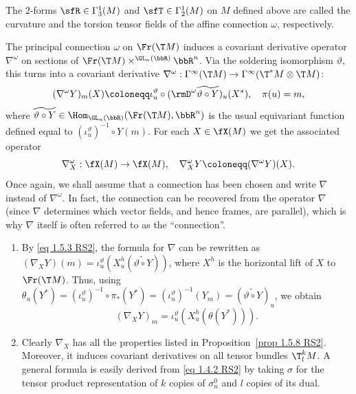 \begin{defn}
    The $2$-forms $\sfR\in \Gamma_3^1(M)$ and $\sfT\in\Gamma_2^1(M)$ on $M$ defined above are called the curvature and the torsion tensor fields of the affine connection $\omega$, respectively.
\end{defn}


The principal connection $\omega$ on $\Fr(\T M)$ induces a covariant derivative operator $\nabla^\omega$ on sections of $\Fr(\T M)\times^{\GL_n(\bbR)}\bbR^n$. Via the soldering isomorphism $\vartheta$, this turns into a covariant derivative $\nabla^\omega:\Gamma^\infty(\T M)\to \Gamma^\infty(\T^\ast M\otimes \T M)$:
\[(\nabla^\omega Y)_m(X)\coloneqq \iota_u^\vartheta\circ (\rmD^\omega \widetilde{\vartheta\circ Y})_u(X^\ast),\quad \pi(u)=m,\]
where $\widetilde{\vartheta\circ Y}\in\Hom_{\GL_n(\bbR)}(\Fr(\T M),\bbR^n)$ is the usual equivariant function defined equal to $(\iota_u^\vartheta)^{-1}\circ Y(m)$. For each $X\in\fX(M)$ we get the associated operator
\[\nabla_X^\omega:\fX(M)\to \fX(M),\quad \nabla_X^\omega Y\coloneqq (\nabla^\omega Y)(X).\]
Once again, we shall assume that a connection has been chosen and write $\nabla$ instead of $\nabla^\omega$. In fact, the connection can be recovered from the operator $\nabla$ (since $\nabla$ determines which vector fields, and hence frames, are parallel), which is why $\nabla$ itself is often referred to as the ``connection''.

\begin{rem}\label{rem 2.1.17 RS2}
    \begin{enumerate}
        \item By \eqref{eq 1.5.3 RS2}, the formula for $\nabla$ can be rewritten as $(\nabla_X Y)(m)=\iota_u^\vartheta(X_u^h(\widetilde{\vartheta\circ Y}))$, where $X^h$ is the horizontal lift of $X$ to $\Fr(\T M)$. Thus, using $\theta_u(Y^\ast)=(\iota_u^\vartheta)^{-1}\circ\pi_\ast(Y^\ast)=(\iota_u^\vartheta)^{-1}(Y_m)=(\widetilde{\vartheta\circ Y})_u$, we obtain 
        \[(\nabla_X Y)_m=\iota_u^\vartheta(X_u^h(\theta(Y^\ast))).\label{eq 2.1.31 RS2}\]
        \item Clearly $\nabla_X$ has all the properties listed in Proposition~\ref{prop 1.5.8 RS2}. Moreover, it induces covariant derivatives on all tensor bundles $\T^k_l M$. A general formula is easily derived from \eqref{eq 1.4.2 RS2} by taking $\sigma$ for the tensor product representation of $k$ copies of $\sigma_n^0$ and $l$ copies of its dual.
    \end{enumerate}
\end{rem}

